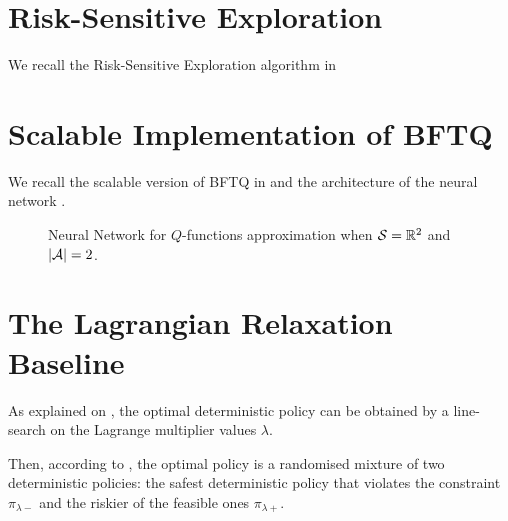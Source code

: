 
\section{Risk-Sensitive Exploration}
\label{sec:risk-sensitive-supp}
We recall the Risk-Sensitive Exploration algorithm in 




\section{Scalable Implementation of BFTQ}
\label{sec:bftq-full}

We recall the scalable version of BFTQ in  and the architecture of the neural network .

\begin{figure}[tp]
    \centering
    
    \caption{Neural Network for $Q$-functions approximation when $\mathcal{S}=\mathbb{R}^2$ and $|\mathcal{A}| = 2$.}
    \label{fig:architecture}
\end{figure}



\section{The Lagrangian Relaxation Baseline}
\label{sec:lagragian}
As explained on , the optimal deterministic policy can be obtained by a line-search on the Lagrange multiplier values $\lambda$.

Then, according to \citet[Theorem 4.4]{BEUTLER1985236}, the optimal policy is a randomised mixture of two deterministic policies: the safest deterministic policy that violates the constraint $\pi_{\lambda-}$ and the riskier of the feasible ones $\pi_{\lambda+}$.


